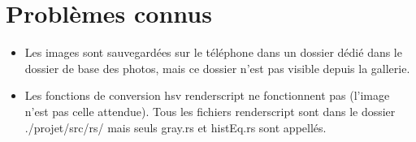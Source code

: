 \documentclass[12pt]{article}
\begin{document}
\begin{itemize}
    
    \end{itemize}

\section{Problèmes connus}

\begin{itemize}
    \item Les images sont sauvegardées sur le téléphone dans un dossier dédié dans le dossier de base des photos, mais ce dossier n'est pas visible depuis la gallerie.\\
    \item Les fonctions de conversion hsv renderscript ne fonctionnent pas (l'image n'est pas celle attendue). Tous les fichiers renderscript sont dans le dossier ./projet/src/rs/ mais seuls gray.rs et histEq.rs sont appellés.\\
\end{itemize}
\end{document}
